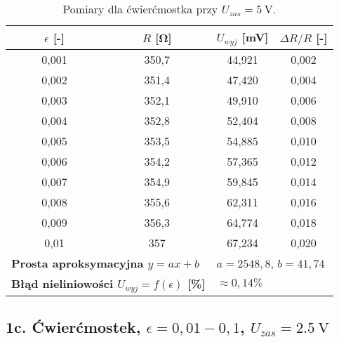 \documentclass[12pt, a4paper]{article}
\begin{document}
	\begin{table}[H]
		\centering
		\caption{Pomiary dla ćwierćmostka przy $U_{zas} = \SI{5}{\volt}$.}
		\begin{tabular}{cccc}
			\toprule
			$\epsilon$ [-] & $R$ [\si{\ohm}] & $U_{wyj}$ [\si{\milli\volt}] & $\Delta R/R$ [-] \\
			\midrule
			0,001 & 350,7 & 44,921 & 0,002 \\
			0,002 & 351,4 & 47,420 & 0,004 \\
			0,003 & 352,1 & 49,910 & 0,006 \\
			0,004 & 352,8 & 52,404 & 0,008 \\
			0,005 & 353,5 & 54,885 & 0,010 \\
			0,006 & 354,2 & 57,365 & 0,012 \\
			0,007 & 354,9 & 59,845 & 0,014 \\
			0,008 & 355,6 & 62,311 & 0,016 \\
			0,009 & 356,3 & 64,774 & 0,018 \\
			0,01 & 357 & 67,234 & 0,020 \\
			\midrule
			\multicolumn{2}{l}{\textbf{Prosta aproksymacyjna $y = ax + b$}} & \multicolumn{2}{l}{$a = 2548,8$, $b = 41,74$} \\
			\multicolumn{2}{l}{\textbf{Błąd nieliniowości $U_{wyj} = f(\epsilon)$ [\%]}} & \multicolumn{2}{l}{$\approx 0,14 \%$} \\
			\bottomrule
		\end{tabular}
	\end{table}
	
	\subsection{1c. Ćwierćmostek, $\epsilon = 0,01-0,1$, $U_{zas} = \SI{2.5}{\volt}$}
	
\end{document}
